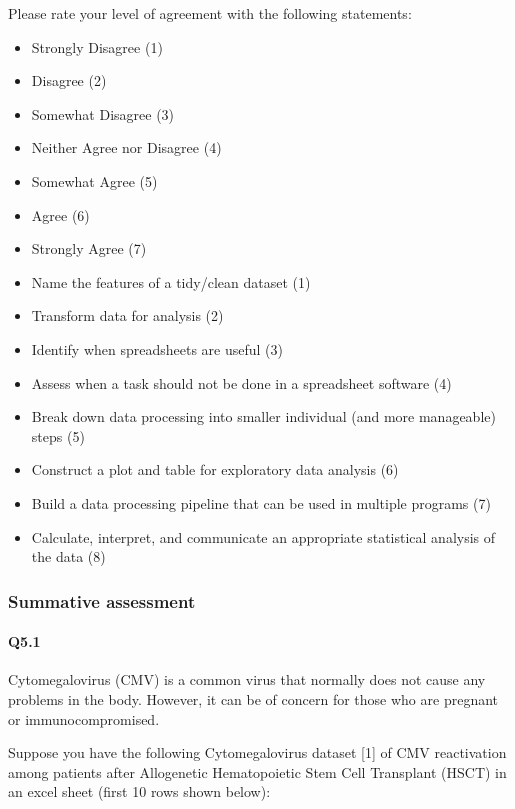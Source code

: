 \documentclass[030-workshop.tex]{subfiles}
\begin{document}
    Please rate your level of agreement with the following statements:

    \begin{itemize}
        \item Strongly Disagree (1)
        \item Disagree (2)
        \item Somewhat Disagree (3)
        \item Neither Agree nor Disagree (4)
        \item Somewhat Agree (5)
        \item Agree (6)
        \item Strongly Agree (7)
    \end{itemize}

    \begin{itemize}
        \item Name the features of a tidy/clean dataset (1)
        \item Transform data for analysis (2)
        \item Identify when spreadsheets are useful (3)
        \item Assess when a task should not be done in a spreadsheet software (4)
        \item Break down data processing into smaller individual (and more manageable) steps (5)
        \item Construct a plot and table for exploratory data analysis (6)
        \item Build a data processing pipeline that can be used in multiple programs (7)
        \item Calculate, interpret, and communicate an appropriate statistical analysis of the data (8)
    \end{itemize}

\subsubsection{Summative assessment}

    \paragraph{Q5.1}

    Cytomegalovirus (CMV) is a common virus that normally does not cause any
    problems in the body. However, it can be of concern for those who are
    pregnant or immunocompromised.

    Suppose you have the following Cytomegalovirus dataset [1] of CMV reactivation
    among patients after Allogenetic Hematopoietic Stem Cell Transplant (HSCT) in an
    excel sheet (first 10 rows shown below):
\end{document}
